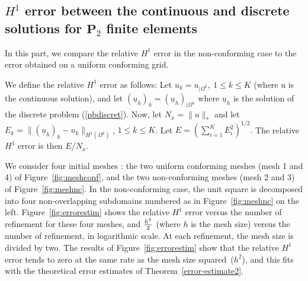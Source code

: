 \documentclass[final]{siamltex}
\begin{document}
\subsection{$H^1$ error between the continuous and discrete solutions for ${\mathbf{P}}_2$ finite elements}
\label{subsec:errP2}
In this part, we compare the relative $H^1$ error in the
non-conforming case to the error obtained on a uniform conforming
grid.

We define the relative $H^1$ error as follows:
Let $u_k=u_{|\Omega^k}, \ 1 \le k \le K$
(where u is the continuous solution), and let
$({{\underline u}}_h)_k=({{\underline u}}_h)_{|\Omega^k}$ where ${{\underline u}}_h$ is the solution of the
discrete problem (\ref{pbdiscret}).  Now, let $N_x=\|u\|_*$ and let
$E_k=\|({{\underline u}}_h)_k-u_k\|_{H^1(\Omega^k)}$, $1 \le k \le K$. Let
$E=(\sum_{i=1}^K E_i^2)^{1/2}.$ The relative $H^1$ error is then
$E/N_x$.

We consider four
initial meshes : the two uniform conforming meshes (mesh 1 and 4) of
Figure~\ref{fig:meshconf}, and the two non-conforming meshes (mesh 2 and 3)
of Figure~\ref{fig:meshnc}.  In the non-conforming case, the unit square is
decomposed into four non-overlapping subdomains numbered as in
Figure~\ref{fig:meshnc} on the left.
Figure~\ref{fig:errorestim} shows the relative $H^1$ error versus the number of
refinement for these four meshes, and ${h^2 \over 2}$ (where $h$ is the mesh size)
versus the number of refinement, in logarithmic scale. At each refinement, the
mesh size is divided by two. The results of Figure~\ref{fig:errorestim} show
that the relative $H^1$ error tends to zero at the same rate as the
mesh size squared~(${h^2}$), and this fits with the theoretical error estimates of
Theorem~\ref{error-estimate2}.
\end{document}
